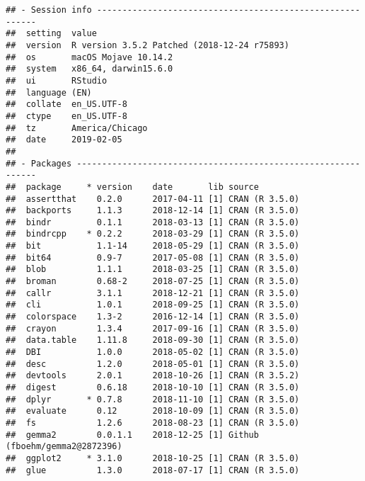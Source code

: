 \documentclass{book}
\begin{document}
\begin{verbatim}
## - Session info ----------------------------------------------------------
##  setting  value                                      
##  version  R version 3.5.2 Patched (2018-12-24 r75893)
##  os       macOS Mojave 10.14.2                       
##  system   x86_64, darwin15.6.0                       
##  ui       RStudio                                    
##  language (EN)                                       
##  collate  en_US.UTF-8                                
##  ctype    en_US.UTF-8                                
##  tz       America/Chicago                            
##  date     2019-02-05                                 
## 
## - Packages --------------------------------------------------------------
##  package     * version    date       lib source                           
##  assertthat    0.2.0      2017-04-11 [1] CRAN (R 3.5.0)                   
##  backports     1.1.3      2018-12-14 [1] CRAN (R 3.5.0)                   
##  bindr         0.1.1      2018-03-13 [1] CRAN (R 3.5.0)                   
##  bindrcpp    * 0.2.2      2018-03-29 [1] CRAN (R 3.5.0)                   
##  bit           1.1-14     2018-05-29 [1] CRAN (R 3.5.0)                   
##  bit64         0.9-7      2017-05-08 [1] CRAN (R 3.5.0)                   
##  blob          1.1.1      2018-03-25 [1] CRAN (R 3.5.0)                   
##  broman        0.68-2     2018-07-25 [1] CRAN (R 3.5.0)                   
##  callr         3.1.1      2018-12-21 [1] CRAN (R 3.5.0)                   
##  cli           1.0.1      2018-09-25 [1] CRAN (R 3.5.0)                   
##  colorspace    1.3-2      2016-12-14 [1] CRAN (R 3.5.0)                   
##  crayon        1.3.4      2017-09-16 [1] CRAN (R 3.5.0)                   
##  data.table    1.11.8     2018-09-30 [1] CRAN (R 3.5.0)                   
##  DBI           1.0.0      2018-05-02 [1] CRAN (R 3.5.0)                   
##  desc          1.2.0      2018-05-01 [1] CRAN (R 3.5.0)                   
##  devtools      2.0.1      2018-10-26 [1] CRAN (R 3.5.2)                   
##  digest        0.6.18     2018-10-10 [1] CRAN (R 3.5.0)                   
##  dplyr       * 0.7.8      2018-11-10 [1] CRAN (R 3.5.0)                   
##  evaluate      0.12       2018-10-09 [1] CRAN (R 3.5.0)                   
##  fs            1.2.6      2018-08-23 [1] CRAN (R 3.5.0)                   
##  gemma2        0.0.1.1    2018-12-25 [1] Github (fboehm/gemma2@2872396)   
##  ggplot2     * 3.1.0      2018-10-25 [1] CRAN (R 3.5.0)                   
##  glue          1.3.0      2018-07-17 [1] CRAN (R 3.5.0)                   

\end{verbatim}
\end{document}
